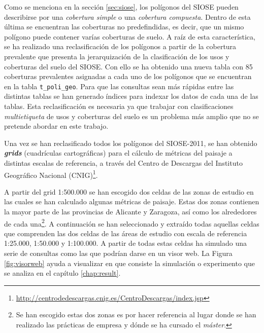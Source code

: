 Como se menciona en la sección \ref{sec:siose}, los polígonos del SIOSE pueden describirse por una \textit{cobertura simple} o una \textit{cobertura compuesta}. Dentro de esta última se encuentran las coberturas no predefindidas, es decir, que un mismo polígono puede contener varías coberturas de suelo. A raíz de esta característica, se ha realizado una reclasificación de los polígonos a partir de la cobertura prevalente que presenta la jerarquización de la clasificación de los usos y coberturas del suelo del SIOSE. Con ello se ha obtenido una nueva tabla con 85 coberturas prevalentes asignadas a cada uno de los polígonos que se encuentran en la tabla \texttt{t\_poli\_geo}. Para que las consultas sean más rápidas entre las distintas tablas se han generado índices para indexar los datos de cada una de las tablas. Esta reclasificación es necesaria ya que trabajar con clasificaciones \textit{multietiqueta} de usos y coberturas del suelo es un problema más amplio que no se pretende abordar en este trabajo.

Una vez se han reclasificado todos los polígonos del SIOSE-2011, se han obtenido \textbf{\textit{grids}} (cuadrículas cartográficas) para el cálculo de métricas del paisaje a distintas escalas de referencia, a través del Centro de Descargas del Instituto Geográfico Nacional (CNIG)\footnote{\url{http://centrodedescargas.cnig.es/CentroDescargas/index.jsp}}.

A partir del grid 1:500.000 se han escogido dos celdas de las zonas de estudio en las cuales se han calculado algunas métricas de paisaje. Estas dos zonas contienen la mayor parte de las provincias de Alicante y Zaragoza, así como los alrededores de cada una\footnote{Se han escogido estas dos zonas es por hacer referencia al lugar donde se han realizado las prácticas de empresa y dónde se ha cursado el \textit{máster}.}. A continuación se han seleccionado y extraído todas aquellas celdas que comprenden las dos celdas de las áreas de estudio con escala de referencia 1:25.000, 1:50.000 y 1:100.000. A partir de todas estas celdas ha simulado una serie de consultas como las que podrían darse en un visor web. La Figura \ref{fig:visorweb} ayuda a visualizar en que consiste la simulación o experimento que se analiza en el capítulo \ref{chap:result}.


